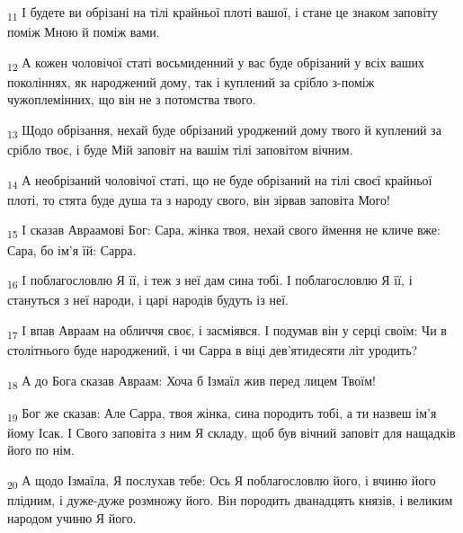 \begin{tcolorbox}
\textsubscript{11} І будете ви обрізані на тілі крайньої плоті вашої, і стане це знаком заповіту поміж Мною й поміж вами.
\end{tcolorbox}
\begin{tcolorbox}
\textsubscript{12} А кожен чоловічої статі восьмиденний у вас буде обрізаний у всіх ваших поколіннях, як народжений дому, так і куплений за срібло з-поміж чужоплемінних, що він не з потомства твого.
\end{tcolorbox}
\begin{tcolorbox}
\textsubscript{13} Щодо обрізання, нехай буде обрізаний уроджений дому твого й куплений за срібло твоє, і буде Мій заповіт на вашім тілі заповітом вічним.
\end{tcolorbox}
\begin{tcolorbox}
\textsubscript{14} А необрізаний чоловічої статі, що не буде обрізаний на тілі своєї крайньої плоті, то стята буде душа та з народу свого, він зірвав заповіта Мого!
\end{tcolorbox}
\begin{tcolorbox}
\textsubscript{15} І сказав Авраамові Бог: Сара, жінка твоя, нехай свого ймення не кличе вже: Сара, бо ім'я їй: Сарра.
\end{tcolorbox}
\begin{tcolorbox}
\textsubscript{16} І поблагословлю Я її, і теж з неї дам сина тобі. І поблагословлю Я її, і стануться з неї народи, і царі народів будуть із неї.
\end{tcolorbox}
\begin{tcolorbox}
\textsubscript{17} І впав Авраам на обличчя своє, і засміявся. І подумав він у серці своїм: Чи в столітнього буде народжений, і чи Сарра в віці дев'ятидесяти літ уродить?
\end{tcolorbox}
\begin{tcolorbox}
\textsubscript{18} А до Бога сказав Авраам: Хоча б Ізмаїл жив перед лицем Твоїм!
\end{tcolorbox}
\begin{tcolorbox}
\textsubscript{19} Бог же сказав: Але Сарра, твоя жінка, сина породить тобі, а ти назвеш ім'я йому Ісак. І Свого заповіта з ним Я складу, щоб був вічний заповіт для нащадків його по нім.
\end{tcolorbox}
\begin{tcolorbox}
\textsubscript{20} А щодо Ізмаїла, Я послухав тебе: Ось Я поблагословлю його, і вчиню його плідним, і дуже-дуже розмножу його. Він породить дванадцять князів, і великим народом учиню Я його.
\end{tcolorbox}
